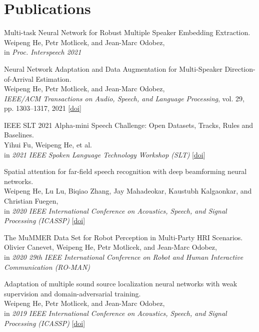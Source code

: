 \documentclass[a4paper,9pt]{extarticle} %
\begin{document}
\section{Publications}
\begin{enumerate}[label={[\arabic*]}]
  \item Multi-task Neural Network for Robust Multiple Speaker Embedding Extraction. \\
        Weipeng He, Petr Motlicek, and Jean-Marc Odobez, \\
        in \textit{Proc. Interspeech 2021}

  \item Neural Network Adaptation and Data Augmentation for Multi-Speaker Direction-of-Arrival Estimation. \\
        Weipeng He, Petr Motlicek, and Jean-Marc Odobez, \\
        \textit{IEEE/ACM Transactions on Audio, Speech, and Language Processing}, vol. 29, pp. 1303–1317, 2021
        [\href{https://doi.org/10.1109/TASLP.2021.3060257}{doi}]

  \item IEEE SLT 2021 Alpha-mini Speech Challenge: Open Datasets, Tracks, Rules and Baselines. \\
        Yihui Fu, Weipeng He, et al. \\
        in \textit{2021 IEEE Spoken Language Technology Workshop (SLT)}
        [\href{https://doi.org/10.1109/SLT48900.2021.9383546}{doi}]

  \item Spatial attention for far-field speech recognition with deep beamforming neural networks. \\
        Weipeng He, Lu Lu, Biqiao Zhang, Jay Mahadeokar, Kaustubh Kalgaonkar, and Christian Fuegen, \\
        in \textit{2020 IEEE International Conference on Acoustics, Speech, and Signal Processing (ICASSP)}
        [\href{https://doi.org/10.1109/ICASSP40776.2020.9053439}{doi}]

  \item The MuMMER Data Set for Robot Perception in Multi-Party HRI Scenarios. \\
        Olivier Canevet, Weipeng He, Petr Motlicek, and Jean-Marc Odobez, \\
        in \textit{2020 29th IEEE International Conference on Robot and Human Interactive Communication (RO-MAN)}

  \item Adaptation of multiple sound source localization neural networks with weak supervision and domain-adversarial training. \\
        Weipeng He, Petr Motlicek, and Jean-Marc Odobez, \\
        in \textit{2019 IEEE International Conference on Acoustics, Speech, and Signal Processing (ICASSP)}
        [\href{https://doi.org/10.1109/ICASSP.2019.8682655}{doi}]


\end{enumerate}
\end{document}
